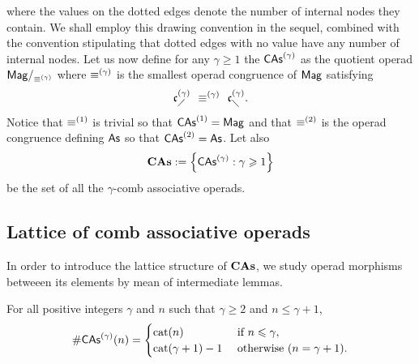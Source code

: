where the values on the dotted edges denote the number of internal
nodes they contain. We shall employ this drawing convention in the
sequel, combined with the convention stipulating that dotted edges
with no value have any number of internal nodes. Let us now define for
any $\gamma \geq 1$ the 
$\mathsf{CAs}^{\left(\gamma\right)}$ as the quotient operad $\mathsf{Mag}/_{\operatorname{\equiv}^{(\gamma)}}$ where
$\operatorname{\equiv}^{(\gamma)}$ is the smallest operad congruence of $\mathsf{Mag}$
satisfying
\begin{equation} \label{equ:congruence_CAs_gamma}
    \mathfrak{c}^{\left(\gamma\right)}_{\diagup} \enspace \operatorname{\equiv}^{(\gamma)} \enspace \mathfrak{c}^{\left(\gamma\right)}_{\diagdown}.
\end{equation}
Notice that $\operatorname{\equiv}^{(1)}$ is trivial so that
$\mathsf{CAs}^{\left(1\right)} = \mathsf{Mag}$ and that $\operatorname{\equiv}^{(2)}$ is the operad congruence
defining $\mathsf{As}$ so that $\mathsf{CAs}^{\left(2\right)} = \mathsf{As}$. Let also
\begin{equation}
    \mathbf{CAs} := \left\{\mathsf{CAs}^{\left(\gamma\right)} : \gamma\geqslant 1\right\}
\end{equation}
be the set of all the $\gamma$-comb associative operads.
\medbreak

\subsection{Lattice of comb associative operads}

In order to introduce the lattice structure of $\mathbf{CAs}$, we study operad
morphisms betweeen its elements by mean of intermediate lemmas.
\medbreak

\begin{Lemma} \label{lem:first_dimensions_CAs}
    For all positive integers $\gamma$ and $n$ such that $\gamma \geq 2$
    and $n \leq \gamma + 1$,
    \begin{equation}
        \# \mathsf{CAs}^{\left(\gamma\right)}(n) =
        \begin{cases}
            \mathrm{cat}(n)
                & \mbox{ if } n \leqslant \gamma, \\
            \mathrm{cat}(\gamma + 1) - 1
                & \mbox{ otherwise } (n = \gamma + 1).
        \end{cases}
    \end{equation}
\end{Lemma}


